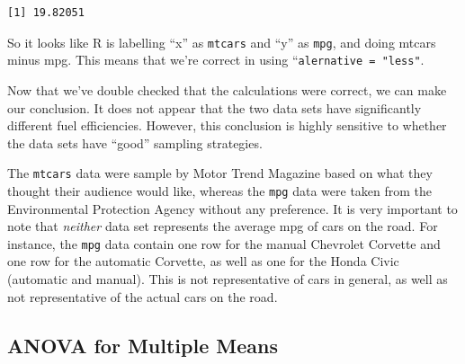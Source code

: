 \documentclass[
  letterpaper,
  DIV=11,
  numbers=noendperiod,
  oneside]{scrreprt}
\begin{document}
\begin{verbatim}
[1] 19.82051
\end{verbatim}

So it looks like R is labelling ``x'' as \texttt{mtcars} and ``y'' as
\texttt{mpg}, and doing mtcars minus mpg. This means that we're correct
in using ``\texttt{alernative\ =\ "less"}.

Now that we've double checked that the calculations were correct, we can
make our conclusion. It does not appear that the two data sets have
significantly different fuel efficiencies. However, this conclusion is
highly sensitive to whether the data sets have ``good'' sampling
strategies.

The \texttt{mtcars} data were sample by Motor Trend Magazine based on
what they thought their audience would like, whereas the \texttt{mpg}
data were taken from the Environmental Protection Agency without any
preference. It is very important to note that \emph{neither} data set
represents the average mpg of cars on the road. For instance, the
\texttt{mpg} data contain one row for the manual Chevrolet Corvette and
one row for the automatic Corvette, as well as one for the Honda Civic
(automatic and manual). This is not representative of cars in general,
as well as not representative of the actual cars on the road.

\hypertarget{anova-for-multiple-means}{%
\subsection{ANOVA for Multiple Means}\label{anova-for-multiple-means}}
\end{document}
